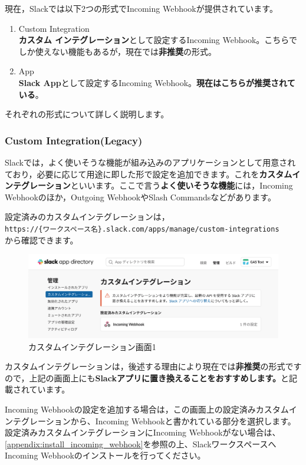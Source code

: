\documentclass[uplatex,a4j]{jsarticle}
\begin{document}
現在，Slackでは以下2つの形式でIncoming Webhookが提供されています。
\begin{enumerate}
\item Custom Integration\\
\textbf{カスタム インテグレーション}として設定するIncoming Webhook。こちらでしか使えない機能もあるが，現在では\textbf{非推奨}の形式。
\item App\\
\textbf{Slack App}として設定するIncoming Webhook。\textbf{現在はこちらが推奨されている}。
\end{enumerate}

それぞれの形式について詳しく説明します。

\subsubsection{Custom Integration(Legacy)}

Slackでは，よく使いそうな機能が組み込みのアプリケーションとして用意されており，必要に応じて用途に即した形で設定を追加できます。これを\textbf{カスタムインテグレーション}といいます。ここで言う\textbf{よく使いそうな機能}には，Incoming Webhookのほか，Outgoing WebhookやSlash Commandsなどがあります。

設定済みのカスタムインテグレーションは，\\
\verb|https://{ワークスペース名}.slack.com/apps/manage/custom-integrations|\\
から確認できます。

\begin{figure}[h]
 \centering
 \includegraphics[keepaspectratio, scale=0.5]{images/custom_integration1.png}
 \caption{カスタムインテグレーション画面1}
 \label{fig:custom_integration1}
\end{figure}

カスタムインテグレーションは，後述する理由により現在では\textbf{非推奨}の形式ですので，上記の画面上にも\textbf{Slackアプリに置き換えることをおすすめします。}と記載されています。


Incoming Webhookの設定を追加する場合は，この画面上の設定済みカスタムインテグレーションから、Incoming Webhookと書かれている部分を選択します。設定済みカスタムインテグレーションにIncoming Webhookがない場合は、\ref{appendix:install_incoming_webhook}を参照の上、SlackワークスペースへIncoming Webhookのインストールを行ってください。
\end{document}
